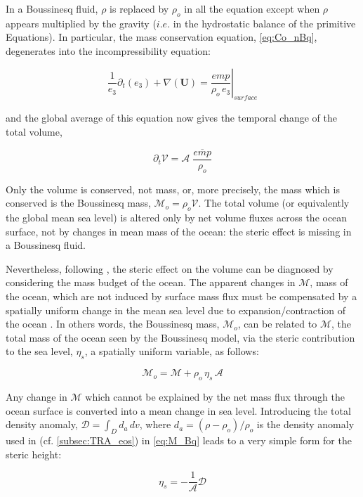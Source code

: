 \documentclass[../tex_main/NEMO_manual]{subfiles}
\begin{document}
In a Boussinesq fluid, $\rho$ is replaced by $\rho_o$ in all the equation except when $\rho$ appears multiplied by
the gravity ($i.e.$ in the hydrostatic balance of the primitive Equations).
In particular, the mass conservation equation, \autoref{eq:Co_nBq}, degenerates into the incompressibility equation:

\[ \frac{1}{e_3} \partial_t ( e_3 ) + \nabla( \textbf{U} )
   = \left. \frac{\textit{emp}}{\rho_o \,e_3}\right|_ \textit{surface}
 \label{eq:Co_Bq} \]

and the global average of this equation now gives the temporal change of the total volume,

\[ \partial_t \mathcal{V} = \mathcal{A} \;\frac{\overline{\textit{emp}}}{\rho_o}
 \label{eq:V_Bq} \]

Only the volume is conserved, not mass, or, more precisely, the mass which is conserved is the Boussinesq mass,
$\mathcal{M}_o = \rho_o \mathcal{V}$.
The total volume (or equivalently the global mean sea level) is altered only by net volume fluxes across
the ocean surface, not by changes in mean mass of the ocean: the steric effect is missing in a Boussinesq fluid.

Nevertheless, following \citep{Greatbatch_JGR94}, the steric effect on the volume can be diagnosed by
considering the mass budget of the ocean. 
The apparent changes in $\mathcal{M}$, mass of the ocean, which are not induced by surface mass flux
must be compensated by a spatially uniform change in the mean sea level due to expansion/contraction of the ocean
\citep{Greatbatch_JGR94}.
In others words, the Boussinesq mass, $\mathcal{M}_o$, can be related to $\mathcal{M}$,
the total mass of the ocean seen by the Boussinesq model, via the steric contribution to the sea level,
$\eta_s$, a spatially uniform variable, as follows:

\[ \mathcal{M}_o = \mathcal{M} + \rho_o \,\eta_s \,\mathcal{A}
 \label{eq:M_Bq} \]

Any change in $\mathcal{M}$ which cannot be explained by the net mass flux through the ocean surface
is converted into a mean change in sea level.
Introducing the total density anomaly, $\mathcal{D}= \int_D d_a \,dv$,
where $d_a = (\rho -\rho_o ) / \rho_o$ is the density anomaly used in \NEMO (cf. \autoref{subsec:TRA_eos})
in \autoref{eq:M_Bq} leads to a very simple form for the steric height:

\[	\eta_s = - \frac{1}{\mathcal{A}} \mathcal{D}
 \label{eq:steric_Bq} \]
\end{document}
